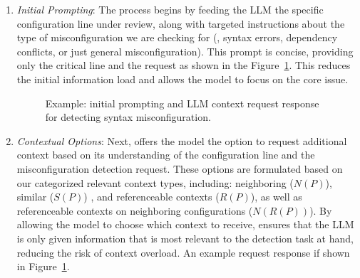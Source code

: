 \begin{enumerate}
    \item \textit{Initial Prompting}: The process begins by feeding the LLM the specific configuration line under review, along with targeted instructions about the type of misconfiguration we are checking for (\eg, syntax errors, dependency conflicts, or just general misconfiguration). This prompt is concise, providing only the critical line and the request as shown in the Figure~\ref{fig:initial_prompt}. This reduces the initial information load and allows the model to focus on the core issue.


    \begin{figure}[t]
    \centering
    \caption{Example: initial prompting and LLM context request response for detecting syntax misconfiguration.}
    \label{fig:initial_prompt}
\end{figure}

    \item \textit{Contextual Options}: Next, \sysname{} offers the model the option to request additional context based on its understanding of the configuration line and the misconfiguration detection request. These options are formulated based on our categorized relevant context types, including: neighboring (\( N(P) \)), similar (\(S(P) \)) , and referenceable contexts (\( R(P) \)), as well as referenceable contexts on neighboring configurations (\( N(R(P)) \)). By allowing the model to choose which context to receive, \sysname{} ensures that the LLM is only given information that is most relevant to the detection task at hand, reducing the risk of context overload. An example request response if shown in Figure~\ref{fig:initial_prompt}.
    

\end{enumerate}
